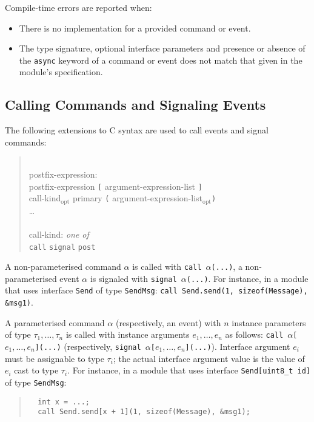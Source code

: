\documentclass[11pt,letterpaper]{article}
\newcommand{\kw}[1]{{\tt #1}}
\newcommand{\code}[1]{{\tt #1}}
\newcommand{\opt}{$_{\mbox{opt}}$\xspace}
\newcommand{\grammarshift}{\vspace*{-.7cm}}
\newcommand{\grammarindent}{\hspace*{2cm}\= \\ \kill}
\begin{document}
Compile-time errors are reported when:
\begin{itemize}
\item There is no implementation for a provided command or event.
\item The type signature, optional interface parameters and presence or
absence of the \kw{async} keyword of a command or event does not match that
given in the module's specification.
\end{itemize}

\subsection{Calling Commands and Signaling Events}

The following extensions to C syntax are used to call events and signal
commands:
\begin{quote} \grammarshift \em \begin{tabbing}
\grammarindent
postfix-expression:\\
\>	postfix-expression \kw{[} argument-expression-list \kw{]}\\
\>	call-kind\opt primary \kw{(} argument-expression-list\opt \kw{)}\\
\>	\ldots
\\\\
call-kind: \emph{one of}\\
\>	\kw{call} \kw{signal} \kw{post}
\end{tabbing} \end{quote}

A non-parameterised command $\alpha$ is called with \code{call
$\alpha$(...)}, a non-parameterised event $\alpha$ is signaled with
\code{signal $\alpha$(...)}. For instance, in a module that uses interface
\code{Send} of type \kw{SendMsg}: \code{call Send.send(1, sizeof(Message),
\&msg1)}.

A parameterised command $\alpha$ (respectively, an event) with $n$
instance parameters of type $\tau_1, \ldots, \tau_n$ is called with
instance arguments $e_1, \ldots, e_n$ as follows: \code{call
$\alpha$[$e_1, \ldots, e_n$](...)}  (respectively, \code{signal
$\alpha$[$e_1, \ldots, e_n$](...)}). Interface argument $e_i$
must be assignable to type $\tau_i$; the actual interface argument value
is the value of $e_i$ cast to type $\tau_i$. For instance, in a module that uses
interface \code{Send[uint8\_t id]} of type \kw{SendMsg}:

\begin{quote} \begin{verbatim}
  int x = ...;
  call Send.send[x + 1](1, sizeof(Message), &msg1);
\end{verbatim} \end{quote}
\end{document}
